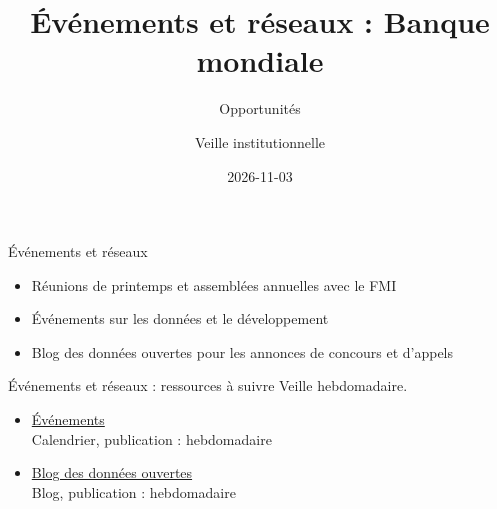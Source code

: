 \documentclass[aspectratio=169,11pt]{beamer}
\title{Événements et réseaux : Banque mondiale}
\subtitle{Opportunités}
\author{Veille institutionnelle}
\date{2026-11-03}
\begin{document}
\begin{frame}\titlepage\end{frame}

\begin{frame}{Événements et réseaux}
\begin{itemize}
\item Réunions de printemps et assemblées annuelles avec le FMI
\item Événements sur les données et le développement
\item Blog des données ouvertes pour les annonces de concours et d'appels
\end{itemize}
\end{frame}

\begin{frame}{Événements et réseaux : ressources à suivre}
\small
Veille hebdomadaire.
\begin{itemize}
\item \href{https://www.worldbank.org/en/events}{Événements}\\{\footnotesize Calendrier, publication : hebdomadaire}
\item \href{https://blogs.worldbank.org/en/opendata}{Blog des données ouvertes}\\{\footnotesize Blog, publication : hebdomadaire}
\end{itemize}
\end{frame}
\end{document}
